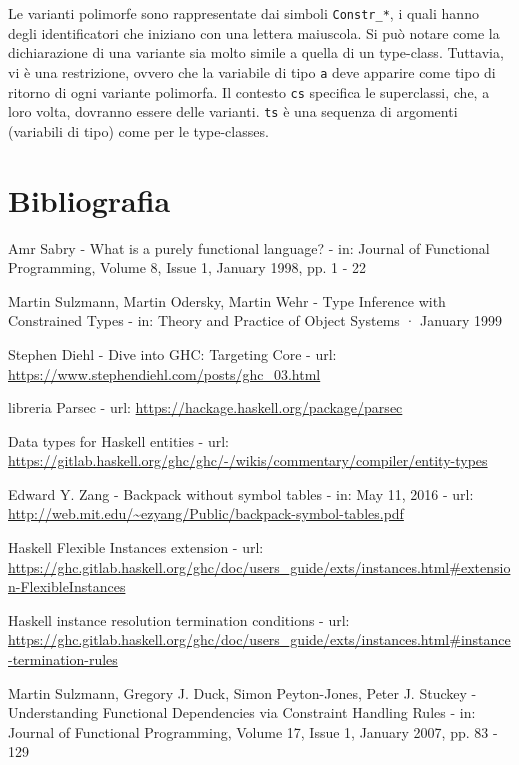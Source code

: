 \documentclass[10pt,a4paper]{article}
\begin{document}
    Le varianti polimorfe sono rappresentate dai simboli \texttt{Constr_*}, i quali hanno degli identificatori che
    iniziano con una lettera maiuscola. Si può notare come la dichiarazione di una variante sia molto simile a quella
    di un type-class. Tuttavia, vi è una restrizione, ovvero che la variabile di tipo \texttt{a} deve apparire come tipo
    di ritorno di ogni variante polimorfa. Il contesto \texttt{cs} specifica le superclassi, che, a loro volta, dovranno
    essere delle varianti. \texttt{ts} è una sequenza di argomenti (variabili di tipo) come per le type-classes. %

\section*{Bibliografia}
\begin{enumerate}[label={[\arabic*]}]
    \item Amr Sabry - What is a purely functional language? - in: Journal of Functional Programming, Volume 8, Issue 1,
    January 1998, pp. 1 - 22
    \item Martin Sulzmann, Martin Odersky, Martin Wehr - Type Inference with Constrained Types - in: Theory and Practice
    of Object Systems · January 1999
    \item Stephen Diehl - Dive into GHC: Targeting Core - url: \url{https://www.stephendiehl.com/posts/ghc_03.html}
    \item libreria Parsec - url: \url{https://hackage.haskell.org/package/parsec}
    \item Data types for Haskell entities - url:
    \url{https://gitlab.haskell.org/ghc/ghc/-/wikis/commentary/compiler/entity-types}
    \item Edward Y. Zang - Backpack without symbol tables - in: May 11, 2016 - url:
    \url{http://web.mit.edu/~ezyang/Public/backpack-symbol-tables.pdf}
    \item Haskell Flexible Instances extension - url:
    \url{https://ghc.gitlab.haskell.org/ghc/doc/users_guide/exts/instances.html#extension-FlexibleInstances}
    \item Haskell instance resolution termination conditions - url:
    \url{https://ghc.gitlab.haskell.org/ghc/doc/users_guide/exts/instances.html#instance-termination-rules}
    \item Martin Sulzmann, Gregory J. Duck, Simon Peyton-Jones, Peter J. Stuckey - Understanding Functional Dependencies
    via Constraint Handling Rules - in: Journal of Functional Programming, Volume 17, Issue 1, January 2007, pp. 83 - 129

\end{enumerate}
\end{document}
